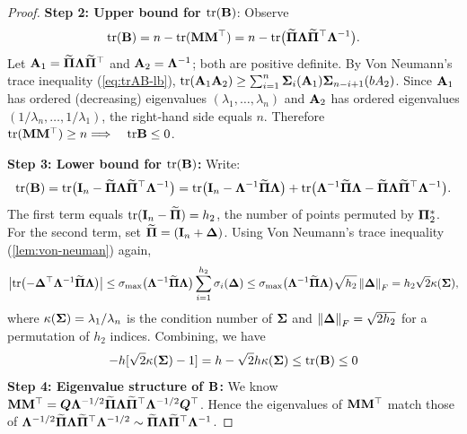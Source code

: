 \documentclass[numsec,webpdf,modern,medium,namedate]{oup-authoring-template}
\theoremstyle{thmstyleone}%
\theoremstyle{thmstyletwo}%
\theoremstyle{thmstylethree}%
\begin{document}
\begin{proof}
\textbf{Step 2: Upper bound for $\mathrm{tr} (\mathbf{B})$}: Observe
\begin{equation*}
\mathrm{tr} (\mathbf{B}) = n - \mathrm{tr}(\mathbf{M}\mathbf{M}^\top)
= n - \mathrm{tr}\bigl(\widetilde{{\boldsymbol{\Pi}}}\boldsymbol{\Lambda} \widetilde{{\boldsymbol{\Pi}}}^\top \boldsymbol{\Lambda}^{-1}\bigr).
\end{equation*}
Let $\mathbf{A}_1=\widetilde{{\boldsymbol{\Pi}}}\boldsymbol{\Lambda} \widetilde{{\boldsymbol{\Pi}}}^\top$ and $\mathbf{A}_2=\boldsymbol{\Lambda}^{-1}$; both are positive definite. By Von Neumann’s trace inequality (\ref{eq:trAB-lb}), $\mathrm{tr}(\mathbf{A}_1\mathbf{A}_2)\geq\sum_{i=1}^n {\boldsymbol{\Sigma}}_i(\mathbf{A}_1){\boldsymbol{\Sigma}}_{n-i+1}(bA_2)$. Since $\mathbf{A}_1$ has ordered (decreasing) eigenvalues $(\lambda_1,\ldots,\lambda_n)$ and $\mathbf{A}_2$ has ordered eigenvalues $(1/\lambda_n,\ldots,1/\lambda_1)$, the right‑hand side equals $n$. Therefore $\mathrm{tr}(\mathbf{M}\mathbf{M}^\top)\geq n \Longrightarrow\quad \mathrm{tr} \mathbf{B}\leq 0$. 

\textbf{Step 3: Lower bound for $\mathrm{tr}(\mathbf{B})$:} Write:
\begin{equation*}
\mathrm{tr} (\mathbf{B})
= \mathrm{tr}\bigl(\mathbf{I}_n - \widetilde{{\boldsymbol{\Pi}}}\boldsymbol{\Lambda} \widetilde{{\boldsymbol{\Pi}}}^\top \boldsymbol{\Lambda}^{-1}\bigr)
= \mathrm{tr}\bigl(\mathbf{I}_n -\boldsymbol{\Lambda}^{-1}\widetilde{{\boldsymbol{\Pi}}}\boldsymbol{\Lambda}\bigr)
+ \mathrm{tr}\bigl(\boldsymbol{\Lambda}^{-1}\widetilde{{\boldsymbol{\Pi}}}\boldsymbol{\Lambda} - \widetilde{{\boldsymbol{\Pi}}}\boldsymbol{\Lambda} \widetilde{{\boldsymbol{\Pi}}}^\top \boldsymbol{\Lambda}^{-1}\bigr).
\end{equation*}
The first term equals $\mathrm{tr}(\mathbf{I}_n-\widetilde{{\boldsymbol{\Pi}}})=h_2$, the number of points permuted by ${\boldsymbol{\Pi}}_2^{\ast}$. For the second term, set $\widetilde{{\boldsymbol{\Pi}}}= (\mathbf{I}_n + \boldsymbol{\Delta})$. Using Von Neumann's trace inequality (\ref{lem:von-neuman}) again,
{
\small
\begin{equation*}
\bigl|\mathrm{tr}\bigl(-{\boldsymbol{\Delta}}^\top\boldsymbol{\Lambda}^{-1}\widetilde{{\boldsymbol{\Pi}}}\boldsymbol{\Lambda}\bigr)\bigr|
\leq {\sigma}_{\max}\bigl(\boldsymbol{\Lambda}^{-1}\widetilde{{\boldsymbol{\Pi}}}\boldsymbol{\Lambda}\bigr)\sum_{i=1}^{h_2}{\sigma}_i(\boldsymbol{\Delta})
\leq {\sigma}_{\max}\bigl(\boldsymbol{\Lambda}^{-1}\widetilde{{\boldsymbol{\Pi}}}\boldsymbol{\Lambda}\bigr) \sqrt{h_2}\left\|\boldsymbol{\Delta}\right\|_F
=h_2\sqrt{2} \kappa({\boldsymbol{\Sigma}}),
\end{equation*}}
where $\kappa({\boldsymbol{\Sigma}})=\lambda_1/\lambda_n$ is the condition number of ${\boldsymbol{\Sigma}}$ and $\left\lVert \boldsymbol{\Delta} \right\rVert_F=\sqrt{2h_2}$ for a permutation of $h_2$ indices.
Combining, we have
\begin{equation}\label{eq:B-trace-bound}
-h[\sqrt{2}\kappa({\boldsymbol{\Sigma}})-1]=h-\sqrt{2}h\kappa({\boldsymbol{\Sigma}})
\leq \mathrm{tr} (\mathbf{B})
\leq 0
\end{equation}
\textbf{Step 4: Eigenvalue structure of $\mathbf{B}$:} We know $\mathbf{M}\mathbf{M}^\top = \boldsymbol{Q}\boldsymbol{\Lambda}^{-1/2}\widetilde{{\boldsymbol{\Pi}}}\boldsymbol{\Lambda} \widetilde{{\boldsymbol{\Pi}}}^\top \boldsymbol{\Lambda}^{-1/2} \boldsymbol{Q}^\top$. Hence the eigenvalues of $\mathbf{M}\mathbf{M}^\top$ match those of $\boldsymbol{\Lambda}^{-1/2}\widetilde{{\boldsymbol{\Pi}}}\boldsymbol{\Lambda} \widetilde{{\boldsymbol{\Pi}}}^\top \boldsymbol{\Lambda}^{-1/2} \sim \widetilde{{\boldsymbol{\Pi}}}\boldsymbol{\Lambda} \widetilde{{\boldsymbol{\Pi}}}^\top \boldsymbol{\Lambda}^{-1}$.


\end{proof}
\end{document}
